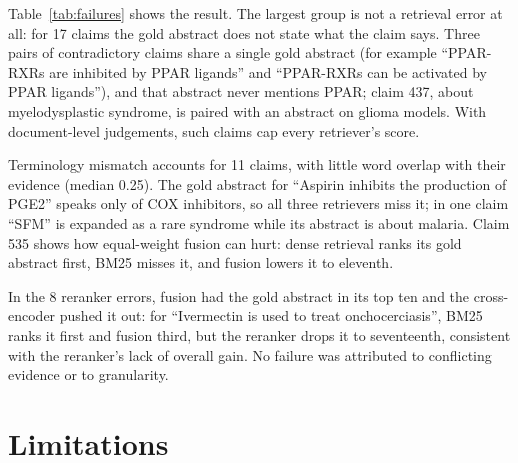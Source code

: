 \documentclass[runningheads]{llncs}
\begin{document}
Table~\ref{tab:failures} shows the result. The largest group is not a retrieval
error at all: for 17 claims the gold abstract does not state what the claim
says. Three pairs of contradictory claims share a single gold abstract (for
example ``PPAR-RXRs are inhibited by PPAR ligands'' and ``PPAR-RXRs can be
activated by PPAR ligands''), and that abstract never mentions PPAR; claim 437,
about myelodysplastic syndrome, is paired with an abstract on glioma models.
With document-level judgements, such claims cap every retriever's score.

Terminology mismatch accounts for 11 claims, with little word overlap with their
evidence (median 0.25). The gold abstract for ``Aspirin inhibits the production
of PGE2'' speaks only of COX inhibitors, so all three retrievers miss it; in one
claim ``SFM'' is expanded as a rare syndrome while its abstract is about malaria.
Claim 535 shows how equal-weight fusion can hurt: dense retrieval ranks its gold
abstract first, BM25 misses it, and fusion lowers it to eleventh.

In the 8 reranker errors, fusion had the gold abstract in its top ten and the
cross-encoder pushed it out: for ``Ivermectin is used to treat onchocerciasis'',
BM25 ranks it first and fusion third, but the reranker drops it to seventeenth,
consistent with the reranker's lack of overall gain. No failure was attributed to
conflicting evidence or to granularity.

\section{Limitations}
\label{sec:limitations}

\end{document}
